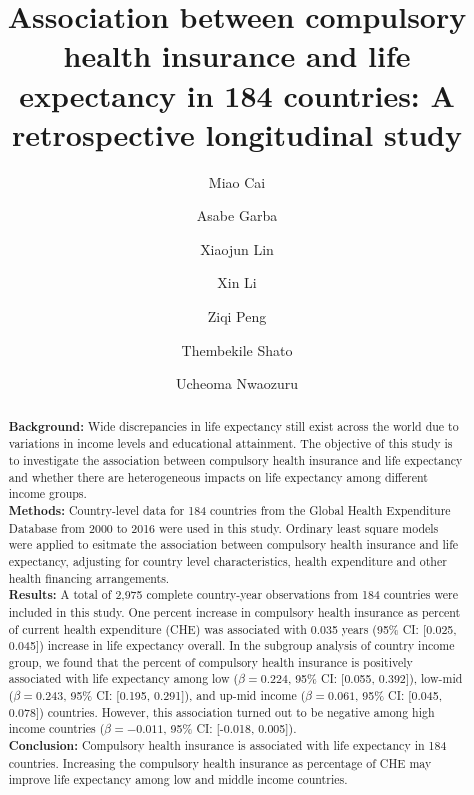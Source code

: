 \documentclass[]{elsarticle} %
\begin{document}
\begin{frontmatter}

  \title{Association between compulsory health insurance and life expectancy in 184 countries: A retrospective longitudinal study}
    \author[SLU]{Miao Cai}
  
    \author[SLU]{Asabe Garba}
  
    \author[SCU]{Xiaojun Lin}
    \author[WHU]{Xin Li}
  
    \author[SLU]{Ziqi Peng}
  
    \author[SLU]{Thembekile Shato}
  
    \author[SLU]{Ucheoma Nwaozuru}
  
      \address[SLU]{College for Public Health and Social Justice, Saint Louis University, Saint Louis, MO, 63108}
    \address[SCU]{West China School of Public Health, Sichuan University, Chengdu, Sichuan, China, 610041}
    \address[WHU]{School of Information Management, Wuhan University, Wuhan, Hubei, China, 430072}
  
  \begin{abstract}
  \textbf{Background: } Wide discrepancies in life expectancy still exist across the world due to variations in income levels and educational attainment. The objective of this study is to investigate the association between compulsory health insurance and life expectancy and whether there are heterogeneous impacts on life expectancy among different income groups.\\
  \textbf{Methods: } Country-level data for 184 countries from the Global Health Expenditure Database from 2000 to 2016 were used in this study. Ordinary least square models were applied to esitmate the association between compulsory health insurance and life expectancy, adjusting for country level characteristics, health expenditure and other health financing arrangements.\\
  \textbf{Results: } A total of 2,975 complete country-year observations from 184 countries were included in this study. One percent increase in compulsory health insurance as percent of current health expenditure (CHE) was associated with 0.035 years (95\% CI: {[}0.025, 0.045{]}) increase in life expectancy overall. In the subgroup analysis of country income group, we found that the percent of compulsory health insurance is positively associated with life expectancy among low (\(\beta = 0.224\), 95\% CI: {[}0.055, 0.392{]}), low-mid (\(\beta = 0.243\), 95\% CI: {[}0.195, 0.291{]}), and up-mid income (\(\beta = 0.061\), 95\% CI: {[}0.045, 0.078{]}) countries. However, this association turned out to be negative among high income countries (\(\beta = -0.011\), 95\% CI: {[}-0.018, 0.005{]}).\\
  \textbf{Conclusion: } Compulsory health insurance is associated with life expectancy in 184 countries. Increasing the compulsory health insurance as percentage of CHE may improve life expectancy among low and middle income countries.
  \end{abstract}
  

\end{frontmatter}
\end{document}

